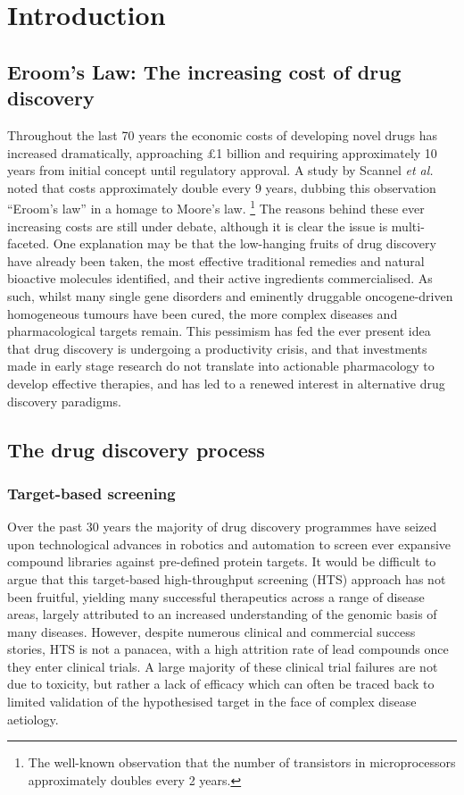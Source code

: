 \documentclass[a4paper,11pt,twoside,openright]{scrbook}
\begin{document}
\chapter{Introduction} \label{chapter:intro}


\section{Eroom's Law: The increasing cost of drug discovery}

Throughout the last 70 years the economic costs of developing novel drugs has increased dramatically, approaching £1 
billion and requiring approximately 10 years from initial concept until regulatory approval.
A study by Scannel \textit{et al.} \cite{Scannell2012} noted that costs approximately double every 9 years, dubbing 
this observation ``Eroom's law'' in a homage to Moore's law. \footnote{The well-known observation that the number of 
transistors in microprocessors approximately doubles every 2 years.}
The reasons behind these ever increasing costs are still under debate, although it is clear the issue is multi-faceted.
One explanation may be that the low-hanging fruits of drug discovery have already been taken, the most effective 
traditional remedies and natural bioactive molecules identified, and their active ingredients commercialised.
As such, whilst many single gene disorders and eminently druggable oncogene-driven homogeneous tumours have been cured, 
the more complex diseases and pharmacological targets remain.
This pessimism has fed the ever present idea that drug discovery is undergoing a productivity crisis, 
\cite{Pammolli2011} and that investments made in early stage research do not translate into actionable pharmacology to 
develop effective therapies, and has led to a renewed interest in alternative drug discovery paradigms.


\section{The drug discovery process}


\subsection{Target-based screening}

Over the past 30 years the majority of drug discovery programmes have seized upon technological advances in robotics 
and automation to screen ever expansive compound libraries against pre-defined protein targets.
It would be difficult to argue that this target-based high-throughput screening (HTS) approach has not been fruitful, 
yielding many successful therapeutics across a range of disease areas, largely attributed to an increased understanding 
of the genomic basis of many diseases.
However, despite numerous clinical and commercial success stories, HTS is not a panacea, with a high attrition rate of 
lead compounds once they enter clinical trials. \cite{Waring2015}
A large majority of these clinical trial failures are not due to toxicity, but rather a lack of efficacy which can 
often be traced back to limited validation of the hypothesised target in the face of complex disease aetiology. 
\cite{Harrison2016}
\end{document}
